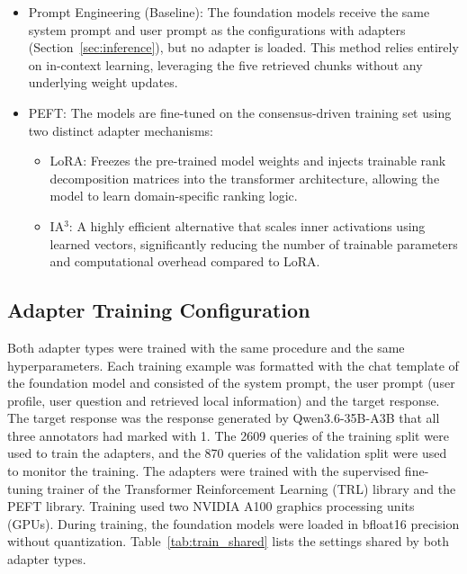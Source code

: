 \documentclass[journal,article,submit,pdftex,moreauthors]{Definitions/mdpi}
\begin{document}
\begin{itemize}[labelsep=2.5mm,topsep=-3pt]
\item Prompt Engineering (Baseline): The foundation models receive the same system prompt and user prompt as the configurations with adapters (Section~\ref{sec:inference}), but no adapter is loaded. This method relies entirely on in-context learning, leveraging the five retrieved chunks without any underlying weight updates.
\item PEFT: The models are fine-tuned on the consensus-driven training set using two distinct adapter mechanisms:
\begin{itemize}[labelsep=2.5mm,topsep=-3pt]
\item LoRA: Freezes the pre-trained model weights and injects trainable rank decomposition matrices into the transformer architecture, allowing the model to learn domain-specific ranking logic.
\item IA$^3$: A highly efficient alternative that scales inner activations using learned vectors, significantly reducing the number of trainable parameters and computational overhead compared to LoRA.
\end{itemize}\vspace{3pt}
\end{itemize}\vspace{3pt}

\subsection{Adapter Training Configuration}\label{sec:training}
Both adapter types were trained with the same procedure and the same hyperparameters. Each training example was formatted with the chat template of the foundation model and consisted of the system prompt, the user prompt (user profile, user question and retrieved local information) and the target response. The target response was the response generated by Qwen3.6-35B-A3B that all three annotators had marked with 1. The 2609 queries of the training split were used to train the adapters, and the 870 queries of the validation split were used to monitor the training. The adapters were trained with the supervised fine-tuning trainer of the Transformer Reinforcement Learning (TRL) library and the PEFT library. Training used two NVIDIA A100 graphics processing units (GPUs). During training, the foundation models were loaded in bfloat16 precision without quantization. Table~\ref{tab:train_shared} lists the settings shared by both adapter types.
\end{document}
